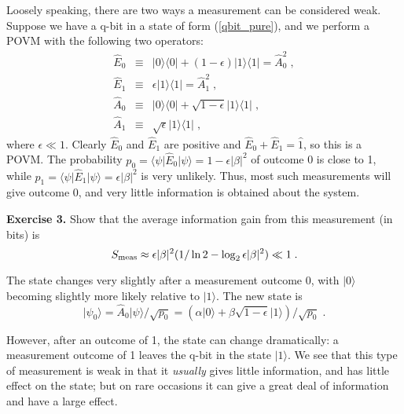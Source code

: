 \documentclass[12pt]{article}
\def\bra#1{{\langle #1 |}}
\def\ket#1{{| #1 \rangle}}
\def\id{{\hat 1}}
\def\E{{\hat E}}
\def\A{{\hat A}}
\begin{document}
Loosely speaking, there are two ways a measurement can be
considered weak.  Suppose we have a q-bit in a state of form
(\ref{qbit_pure}), and we perform a POVM with the following two operators:
\begin{eqnarray}
\E_0 &\equiv& \ket0\bra0 + (1-\epsilon)\ket1\bra1
  = \A_0^2 \;, \nonumber\\ 
\E_1 &\equiv& \epsilon \ket1\bra1 = \A_1^2 \;, \nonumber\\
\A_0 &\equiv& \ket0\bra0 + \sqrt{1-\epsilon}\ket1\bra1
  \;, \nonumber\\ 
\A_1 &\equiv& \sqrt\epsilon \ket1\bra1 \;,
\label{weak1}
\end{eqnarray}
where $\epsilon \ll 1$.  Clearly $\E_0$ and $\E_1$ are positive and
$\E_0+\E_1=\id$, so this is a POVM.
The probability $p_0 = \bra\psi\E_0\ket\psi = 1-\epsilon|\beta|^2$
of outcome 0 is close to 1, while
$p_1 = \bra\psi\E_1\ket\psi = \epsilon|\beta|^2$ is
very unlikely.  Thus, most such measurements will give outcome 0, and very
little information is obtained about the system.

\medskip\noindent
{\bf Exercise 3.}  Show that the average information
gain from this measurement (in bits) is
\begin{equation}
S_{\rm meas} \approx  \epsilon|\beta|^2(1/\ln 2 - \log_2 \epsilon|\beta|^2)
  \ll 1 \;.
\end{equation}
\medskip

The state changes very slightly after a measurement outcome 0,
with $\ket0$ becoming slightly more likely relative to $\ket1$.
The new state is
\begin{equation}
\ket{\psi_0} = \A_0\ket\psi/\sqrt{p_0}
  = (\alpha\ket0 + \beta \sqrt{1-\epsilon}\ket1)/\sqrt{p_0} \;.
\end{equation}

However, after an outcome of 1, the state can change dramatically:  a
measurement outcome of 1 leaves the q-bit in the state $\ket1$.  We see
that this type of measurement is weak in that it {\it usually} gives little
information, and has little effect on the state; but on rare occasions it
can give a great deal of information and have a large effect.
\end{document}
